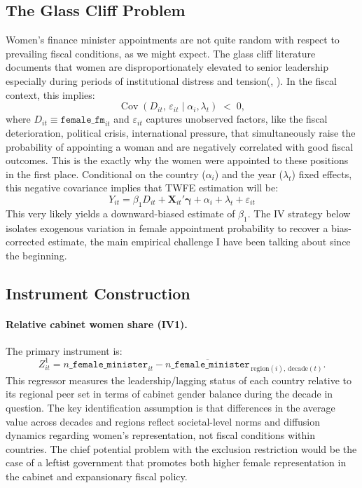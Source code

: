 \documentclass[12pt]{article}
\renewcommand{\citep}[1]{(\textit{\citeauthor{#1}}, \citeyear{#1})}
\begin{document}
\subsection{The Glass Cliff Problem}

Women's finance minister appointments are not quite random with respect to prevailing fiscal conditions, as we might expect. The glass cliff literature documents that women are disproportionately elevated to senior leadership especially during periods of institutional distress and tension\citep{ryan2005,cook2010,glass2013}. In the fiscal context, this implies:
\begin{equation}
  \operatorname{Cov}(D_{it},\,\varepsilon_{it} \mid \alpha_i, \lambda_t)
  \;<\; 0,
  \label{eq:glascliff}
\end{equation}
where $D_{it} \equiv \texttt{female\_fm}_{it}$ and $\varepsilon_{it}$ captures unobserved factors, like the fiscal deterioration, political crisis, international pressure, that simultaneously raise the probability of appointing a woman and are negatively correlated with good fiscal outcomes. This is the exactly why the women were appointed to these positions in the first place. Conditional on the country ($\alpha_i$) and the year ($\lambda_t$) fixed effects, this negative covariance implies that TWFE estimation will be:
\begin{equation}
  Y_{it}
    = \beta_1 D_{it}
    + \mathbf{X}_{it}'\boldsymbol{\gamma}
    + \alpha_i
    + \lambda_t
    + \varepsilon_{it}
  \label{eq:twfe}
\end{equation}
This very likely yields a downward-biased estimate of $\beta_1$. The IV strategy below isolates exogenous variation in female appointment probability to recover a bias-corrected estimate, the main empirical challenge I have been talking about since the beginning.

\subsection{Instrument Construction}

\paragraph{Relative cabinet women share (IV1).}
The primary instrument is:
\begin{equation}
  Z^{1}_{it}
    = n\texttt{\_female\_minister}_{it}
    - \overline{n\texttt{\_female\_minister}}_{\,\mathrm{region}(i),\,\mathrm{decade}(t)}.
  \label{eq:iv1}
\end{equation}
This regressor measures the leadership/lagging status of each country relative to its regional peer set in terms of cabinet gender balance during the decade in question. The key identification assumption is that differences in the average value across decades and regions reflect societal-level norms and diffusion dynamics regarding women’s representation, not fiscal conditions within countries. The chief potential problem with the exclusion restriction would be the case of a leftist government that promotes both higher female representation in the cabinet and expansionary fiscal policy.
\end{document}
